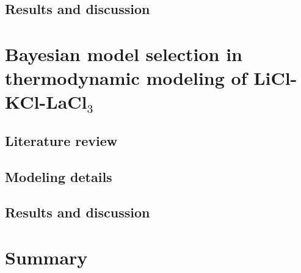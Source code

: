 \subsection{Results and discussion} \label{moltensalts:ssec:LiFLnF3result}


\section{Bayesian model selection in thermodynamic modeling of LiCl-KCl-LaCl${_3}$} \label{moltensalts:sec:LaCl3}

\subsection{Literature review} \label{moltensalts:ssec:LaCl3lit}


\subsection{Modeling details} \label{moltensalts:ssec:LaCl3model}


\subsection{Results and discussion} \label{moltensalts:ssec:LaCl3result}


\section{Summary} \label{intermetallics:sec:Summary}
